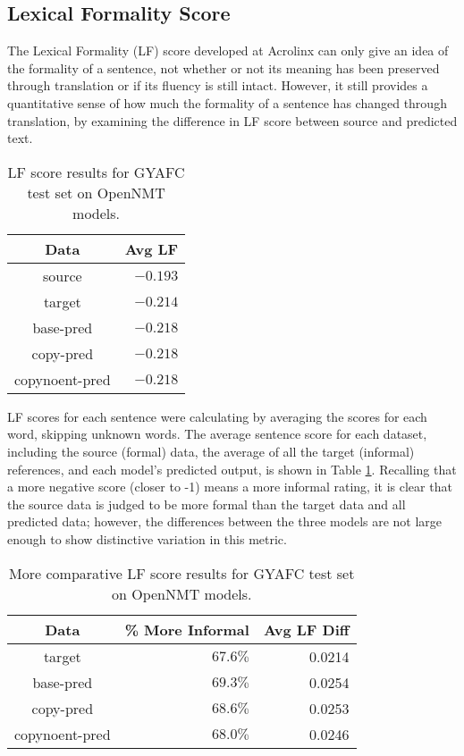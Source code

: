 \subsection{Lexical Formality Score}

The Lexical Formality (LF) score developed at Acrolinx can only give an idea of the formality of a sentence, not whether or not its meaning has been preserved through translation or if its fluency is still intact. However, it still provides a quantitative sense of how much the formality of a sentence has changed through translation, by examining the difference in LF score between source and predicted text.

\begin{table}[h]
\centering
 \begin{tabular}{|| c | r ||} 
 \hline
 Data & Avg LF  \\ [0.3ex] 
 \hline\hline
 source & $-0.193$ \\
 \hline
 target & $-0.214$ \\
 \hline
 base-pred & $-0.218$ \\
 \hline
 copy-pred & $-0.218$ \\
 \hline
 copynoent-pred & $-0.218$ \\
 \hline
\end{tabular}
\caption{LF score results for GYAFC test set on OpenNMT models.}
\label{gyafc-lf-scores}
\end{table}

LF scores for each sentence were calculating by averaging the scores for each word, skipping unknown words. The average sentence score for each dataset, including the source (formal) data, the average of all the target (informal) references, and each model's predicted output, is shown in Table \ref{gyafc-lf-scores}. Recalling that a more negative score (closer to -1) means a more informal rating, it is clear that the source data is judged to be more formal than the target data and all predicted data; however, the differences between the three models are not large enough to show distinctive variation in this metric.

\begin{table}[h]
\centering
 \begin{tabular}{|| c | r | r ||} 
 \hline
 Data & \% More Informal & Avg LF Diff \\ [0.3ex] 
 \hline\hline
 target & $67.6\%$ & 0.0214 \\
 \hline
 base-pred & $69.3\%$ & 0.0254 \\
 \hline
 copy-pred & $68.6\%$ & 0.0253 \\
 \hline
 copynoent-pred & $68.0\%$ & 0.0246 \\
 \hline
\end{tabular}
\caption{More comparative LF score results for GYAFC test set on OpenNMT models.}
\label{gyafc-lf-compare-scores}
\end{table}

